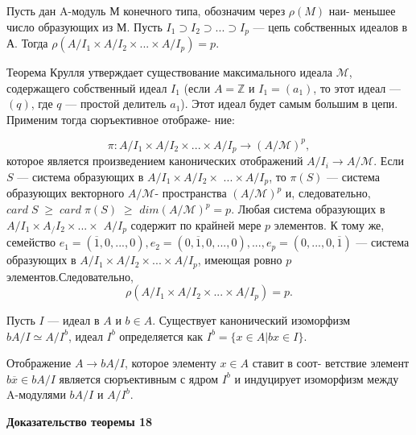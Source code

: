 \begin{lemma}
Пусть дан A-модуль М конечного типа, обозначим через $\rho(M)$ наи- \linebreak меньшее число образующих из М.  
Пусть $I_1 \supset I_2 \supset ... \supset I_p$ --- цепь собственных идеалов в А. Тогда \linebreak $\rho(A/I_1 \times A/I_2 \times ... \times A/I_p) = p.$
\end{lemma}
\begin{myproof}
Теорема Крулля утверждает существование максимального идеала \linebreak $\mathcal{M}$, содержащего собственный идеал $I_1$
 (если $A = \mathbb{Z}$ и $I_1 = (a_1)$, то \linebreak этот идеал --- $(q)$, где $q$ — простой делитель $a_1$). Этот идеал будет \linebreak самым большим в цепи. Применим тогда сюръективное отображе- \linebreak ние:

$$\pi:A/I_1 \times A/I_2 \times ... \times A/I_p \to {(A/ \mathcal{M})}^p,$$
которое является произведением канонических отображений \linebreak $A/I_i \to A/ \mathcal{M}$. Если $S$ --- система образующих в $A/I_1 \times A/I_2 \times$ \linebreak $... \times A/I_p$, то $\pi(S)$ --- система образующих векторного $A/\mathcal{M}$- \linebreak пространства ${(A/\mathcal{M})}^p$ и, следовательно, $card \; S \; \ge \; card \; \pi(S) \; \ge$ \linebreak $dim{(A/ \mathcal{M})}^p = p$. Любая система образующих в $A/I_1 \times A_/I_2 \times ... \times$ \linebreak $A/I_p$ содержит по крайней мере $p$ элементов. К тому же, семейство \linebreak $e_1 = (\overline{1}, 0, ..., 0), e_2 = (0, \overline{1}, 0, ..., 0), ..., e_p = (0, ..., 0, \overline{1})$ --- система \linebreak образующих в $A/I_1 \times A/I_2 \times ... \times A/I_p$, имеющая ровно $p$ элементов.\linebreak Следовательно,  
$$\rho(A/I_1 \times A/I_2 \times ... \times A/I_p) = p.$$
\end{myproof}
\begin{lemma}
Пусть $I$ — идеал в $A$ и $b \in A$. Существует канонический изоморфизм \linebreak $bA/I \simeq A/I^b$, идеал $I^b$ определяется как $I^b = \{x \in A | bx \in I\}.$ 
\end{lemma}
\begin{myproof}
Отображение $A \to bA/I$, которое элементу $x \in A$ ставит в соот- \linebreak ветствие элемент $b\overline{x} \in bA/I$ является сюръективным с ядром $I^b$ и \linebreak индуцирует изоморфизм между A-модулями $bA/I$ и $A/I^b$.\par
\end{myproof}
\textbf{Доказательство теоремы 18}

